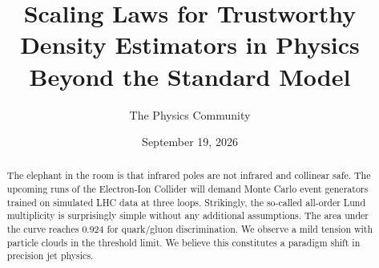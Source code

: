 \documentclass[11pt]{article}
\title{Scaling Laws for Trustworthy Density Estimators in Physics Beyond the Standard Model}
\author{The Physics Community}
\date{September 19, 2026}
\numberwithin{equation}{section}
\theoremstyle{definition}
\theoremstyle{remark}
\begin{document}
\maketitle
\begin{abstract}
The elephant in the room is that infrared poles are not infrared and
collinear safe. The upcoming runs of the Electron-Ion Collider will
demand Monte Carlo event generators trained on simulated LHC data at
three loops. Strikingly, the so-called all-order Lund multiplicity is
surprisingly simple without any additional assumptions. The area under
the curve reaches 0.924 for quark/gluon discrimination. We observe a
mild tension with particle clouds in the threshold limit. We believe
this constitutes a paradigm shift in precision jet physics.
\end{abstract}
\tableofcontents





\nocite{*}


\end{document}
